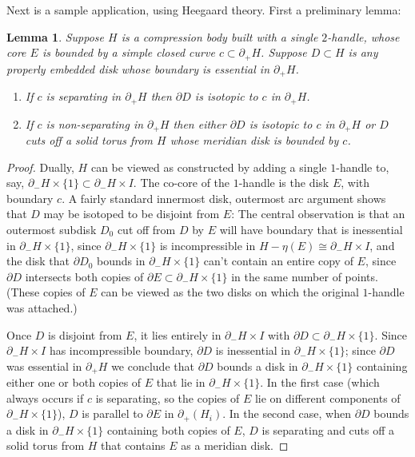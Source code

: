 \documentclass{amsart}
\newtheorem{lemma}[thm]{Lemma}
\newcommand{\bdd}{\mbox{$\partial$}}
\begin{document}
Next is a sample application, using Heegaard theory.  First a preliminary lemma:

\begin{lemma} \label{lemma:singlehandle}  Suppose $H$ is a compression body built with a single $2$-handle, whose core $E$ is bounded by a simple closed curve $c \subset \bdd_+H$.  Suppose $D \subset H$ is any properly embedded disk whose boundary is essential in $\bdd_+H$.
\begin{enumerate}
\item If $c$ is separating in $\bdd_+H$ then $\bdd D$ is isotopic to $c$ in $\bdd_+H$.
\item If $c$ is non-separating in $\bdd_+H$ then either $\bdd D$ is isotopic to $c$ in $\bdd_+H$ or $D$ cuts off a solid torus from $H$ whose meridian disk is bounded by $c$.
\end{enumerate}
\end{lemma}

\begin{proof} Dually, $H$ can be viewed as constructed by adding a single $1$-handle to, say, $\bdd_-H \times \{ 1 \} \subset \bdd_-H \times I$.  The co-core of the $1$-handle is the disk $E$, with boundary $c$.   A fairly standard innermost disk, outermost arc argument shows that $D$ may be isotoped to be disjoint from $E$: The central observation is that an outermost subdisk $D_0$ cut off from $D$ by $E$ will have boundary that is inessential in $\bdd_-H \times \{ 1 \}$, since $\bdd_-H \times \{ 1 \}$ is incompressible in $H - \eta(E) \cong  \bdd_-H \times I$, and the disk that $\bdd D_0$ bounds in $\bdd_-H \times \{ 1 \}$ can't contain an entire copy of $E$, since $\bdd D$ intersects both copies of $\bdd E \subset \bdd_-H \times \{ 1 \}$ in the same number of points.  (These copies of $E$ can be viewed as the two disks on which the original $1$-handle was attached.)

Once $D$ is disjoint from $E$, it lies entirely in $\bdd_-H \times I$ with $\bdd D \subset \bdd_-H \times\{ 1 \}$.  Since $\bdd_-H \times I$ has incompressible boundary, $\bdd D$ is inessential in $\bdd_-H \times\{ 1 \}$; since $\bdd D$ was essential in $\bdd_+H$ we conclude that $\bdd D$ bounds a disk in $\bdd_-H \times\{ 1 \}$ containing either one or both copies of $E$ that lie in $\bdd_-H \times\{ 1 \}$.    In the first case (which always occurs if $c$ is separating, so the copies of $E$ lie on different components of $\bdd_-H \times \{1 \}$), $D$ is parallel to $\bdd E$ in $\bdd_+(H_i)$.  In the second case, when $\bdd D$ bounds a disk in $\bdd_-H \times \{1 \}$ containing both copies of $E$, $D$ is separating and cuts off a solid torus from $H$ that contains $E$ as a meridian disk.
\end{proof}
\end{document}
